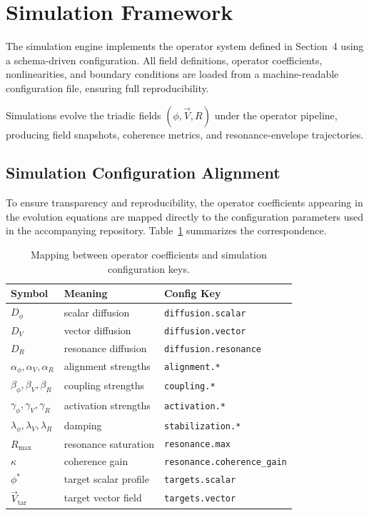 \section{Simulation Framework}

The simulation engine implements the operator system defined in Section~4 using
a schema-driven configuration. All field definitions, operator coefficients,
nonlinearities, and boundary conditions are loaded from a machine-readable
configuration file, ensuring full reproducibility.

Simulations evolve the triadic fields
\((\phi, \vec{V}, R)\) under the operator pipeline, producing field snapshots,
coherence metrics, and resonance-envelope trajectories.

\subsection{Simulation Configuration Alignment}

To ensure transparency and reproducibility, the operator coefficients appearing
in the evolution equations are mapped directly to the configuration parameters
used in the accompanying repository. Table~\ref{tab:config-map} summarizes the
correspondence.

\begin{table}[h]
\centering
\begin{tabular}{lll}
\hline
Symbol & Meaning & Config Key \\
\hline
$D_\phi$ & scalar diffusion & \texttt{diffusion.scalar} \\
$D_V$ & vector diffusion & \texttt{diffusion.vector} \\
$D_R$ & resonance diffusion & \texttt{diffusion.resonance} \\
$\alpha_\phi, \alpha_V, \alpha_R$ & alignment strengths & \texttt{alignment.*} \\
$\beta_\phi, \beta_V, \beta_R$ & coupling strengths & \texttt{coupling.*} \\
$\gamma_\phi, \gamma_V, \gamma_R$ & activation strengths & \texttt{activation.*} \\
$\lambda_\phi, \lambda_V, \lambda_R$ & damping & \texttt{stabilization.*} \\
$R_{\max}$ & resonance saturation & \texttt{resonance.max} \\
$\kappa$ & coherence gain & \texttt{resonance.coherence\_gain} \\
$\phi^\ast$ & target scalar profile & \texttt{targets.scalar} \\
$\vec{V}_{\mathrm{tar}}$ & target vector field & \texttt{targets.vector} \\
\hline
\end{tabular}
\caption{Mapping between operator coefficients and simulation configuration keys.}
\label{tab:config-map}
\end{table}

